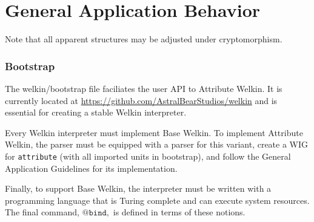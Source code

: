 

\section{General Application Behavior}

Note that all apparent structures may be adjusted under cryptomorphism.

\subsubsection{Bootstrap}
The welkin/bootstrap file faciliates the user API to Attribute Welkin. It is currently located at \url{https://github.com/AstralBearStudios/welkin} and is essential for creating a stable Welkin interpreter.

Every Welkin interpreter must implement Base Welkin. To implement Attribute Welkin, the parser must be equipped with a parser for this variant, create a WIG for \texttt{attribute} (with all imported units in bootstrap), and follow the General Application Guidelines for its implementation.

Finally, to support Base Welkin, the interpreter must be written with a programming language that is Turing complete and can execute system resources. The final command, $\texttt{@bind},$ is defined in terms of these notions. %



